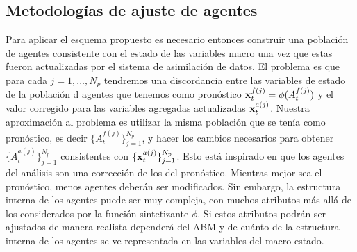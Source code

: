 \subsection{Metodologías de ajuste de agentes} \label{sec:agents_adjustment}

Para aplicar el esquema propuesto es necesario entonces construir una población de agentes consistente con el estado de las variables macro una vez que estas fueron actualizadas por el sistema de asimilación de datos. El problema es que para cada $j = 1, ..., N_p$ tendremos una discordancia entre las variables de estado de la población d agentes que tenemos como pronóstico $\mathbf{x}_t^{f(j)} = \phi (A_t^{f(j)})$ y el valor corregido para las variables agregadas actualizadas $\mathbf{x}_t^{a(j)}$. Nuestra aproximación al problema es utilizar la misma población que se tenía como pronóstico, es decir $\{A_t^{f(j)}\}_{j=1}^{N_p}$, y hacer los cambios necesarios para obtener $\{A_t^{a(j)}\}_{j=1}^{N_p}$ consistentes con $\{\mathbf{x}_t^{a(j)}\}_{j=1}^{N_p}$. Esto está inspirado en que los agentes del análisis son una corrección de los del pronóstico. Mientras mejor sea el pronóstico, menos agentes deberán ser modificados. Sin embargo, la estructura interna de los agentes puede ser muy compleja, con muchos atributos más allá de los considerados por la función sintetizante $\phi$. Si estos atributos podrán ser ajustados de manera realista dependerá del ABM y de cuánto de la estructura interna de los agentes se ve representada en las variables del macro-estado.

